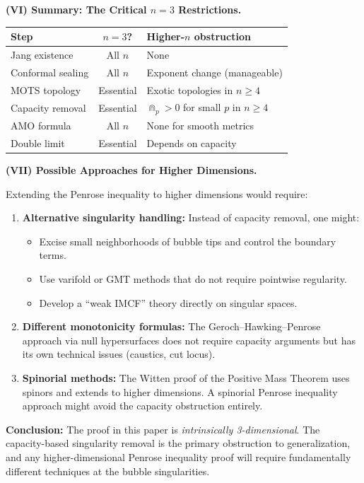 \begin{remark}
\textbf{(VI) Summary: The Critical $n = 3$ Restrictions.}

\begin{center}
\begin{tabular}{|l|c|l|}
\hline
\textbf{Step} & \textbf{$n = 3$?} & \textbf{Higher-$n$ obstruction} \\
\hline
Jang existence & All $n$ & None \\
Conformal sealing & All $n$ & Exponent change (manageable) \\
MOTS topology & Essential & Exotic topologies in $n \ge 4$ \\
Capacity removal & Essential & $\Cap_p > 0$ for small $p$ in $n \ge 4$ \\
AMO formula & All $n$ & None for smooth metrics \\
Double limit & Essential & Depends on capacity \\
\hline
\end{tabular}
\end{center}

\textbf{(VII) Possible Approaches for Higher Dimensions.}

Extending the Penrose inequality to higher dimensions would require:
\begin{enumerate}
    \item \textbf{Alternative singularity handling:} Instead of capacity removal, one might:
    \begin{itemize}
        \item Excise small neighborhoods of bubble tips and control the boundary terms.
        \item Use varifold or GMT methods that do not require pointwise regularity.
        \item Develop a ``weak IMCF'' theory directly on singular spaces.
    \end{itemize}
    
    \item \textbf{Different monotonicity formulas:} The Geroch--Hawking--Penrose approach via null hypersurfaces does not require capacity arguments but has its own technical issues (caustics, cut locus).
    
    \item \textbf{Spinorial methods:} The Witten proof of the Positive Mass Theorem uses spinors and extends to higher dimensions. A spinorial Penrose inequality approach might avoid the capacity obstruction entirely.
\end{enumerate}

\textbf{Conclusion:} The proof in this paper is \emph{intrinsically 3-dimensional}. The capacity-based singularity removal is the primary obstruction to generalization, and any higher-dimensional Penrose inequality proof will require fundamentally different techniques at the bubble singularities.
\end{remark}

